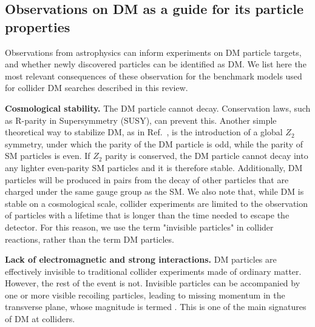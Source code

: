 \begin{textbox}[!h]
\section{Observations on DM as a guide for its particle properties}

Observations from astrophysics can inform experiments on DM particle targets, and whether newly discovered particles can be identified as DM. 
We list here the most relevant consequences of these observation for the benchmark models used for collider DM searches described in this review. 

\textbf{Cosmological stability.}
The DM particle cannot decay. Conservation laws, such as R-parity in Supersymmetry (SUSY), can prevent this. 
Another simple theoretical way to stabilize DM, as in Ref.~\cite{Batell:2010bp}, is the introduction of a global $Z_2$ symmetry, under which the parity of the DM particle is odd, while the parity of SM particles is even.
If $Z_2$  parity is conserved, the DM particle cannot decay into any lighter even-parity SM particles and it is therefore stable. 
Additionally, DM particles will be produced in pairs from the decay of other particles that are charged under the same gauge group as the SM.
We also note that, while DM is stable on a cosmological scale, collider experiments are limited to the observation of particles with a lifetime that is longer than the time needed to escape the detector. 
For this reason, we use the term "invisible particles" in collider reactions, rather than the term DM particles. 

\textbf{Lack of electromagnetic and strong interactions.} 
DM particles are effectively invisible to traditional collider experiments made of ordinary matter. However, the rest of the event is not. 
Invisible particles can be accompanied by one or more visible recoiling particles, leading to missing momentum in the transverse plane, whose magnitude is termed \MET. 
This is one of the main signatures of DM at colliders.


\end{textbox}

